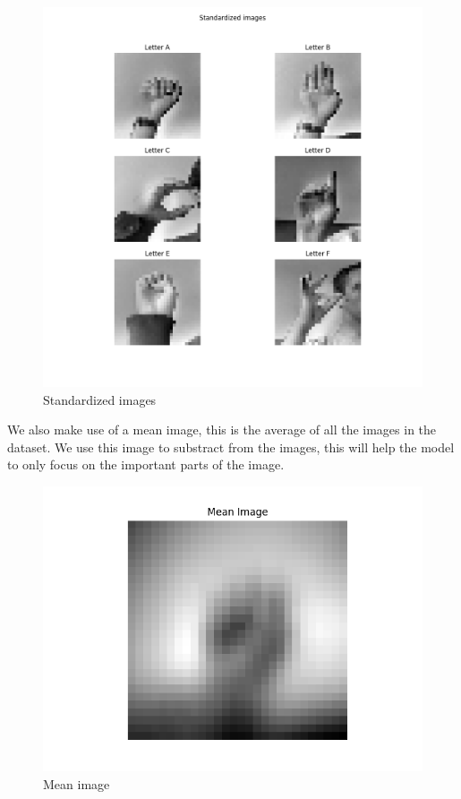 \documentclass[../paper.tex]{subfiles}
\begin{document}
    \begin{figure}[h]
        \centering
        \includegraphics[width=\linewidth]{letters_grid_standardized_6}
        \caption{Standardized images}
        \label{fig:standardized_images}
    \end{figure}
    We also make use of a mean image, this is the average of all the images in the dataset.
    We use this image to substract from the images, this will help the model to only focus on the important parts of the image.
    \begin{figure}[h]
        \centering
        \includegraphics[width=\linewidth]{mean_image}
        \caption{Mean image}
        \label{fig:mean_image}
    \end{figure}
\end{document}
